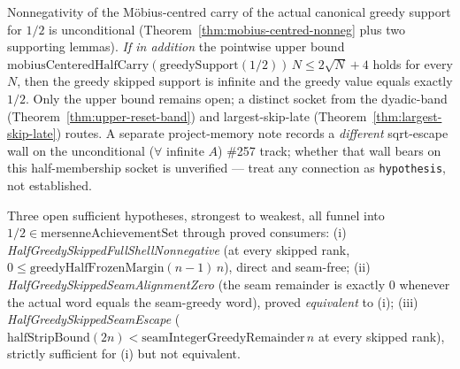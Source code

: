\begin{thm}
\label{thm:sqrt-bound-route}
Nonnegativity of the M\"obius-centred carry of the actual canonical greedy support for
$1/2$ is unconditional (Theorem~\ref{thm:mobius-centred-nonneg} plus two supporting
lemmas). \emph{If in addition} the pointwise upper bound
$\mathrm{mobiusCenteredHalfCarry}(\mathrm{greedySupport}(1/2))\,N\le 2\sqrt N+4$ holds for
every $N$, then the greedy skipped support is infinite and the greedy value equals
exactly $1/2$. Only the upper bound remains open; a distinct socket from the dyadic-band
(Theorem~\ref{thm:upper-reset-band}) and largest-skip-late
(Theorem~\ref{thm:largest-skip-late}) routes. A separate project-memory note records a
\emph{different} sqrt-escape wall on the unconditional ($\forall$ infinite $A$) \#257
track; whether that wall bears on this half-membership socket is unverified — treat any
connection as \texttt{hypothesis}, not established.
\par{}
\end{thm}

\begin{thm}
\label{thm:frozen-margin}
Three open sufficient hypotheses, strongest to weakest, all funnel into
$1/2\in\mathrm{mersenneAchievementSet}$ through proved consumers: (i)
\emph{HalfGreedySkippedFullShellNonnegative}
(at every skipped rank, $0\le\mathrm{greedyHalfFrozenMargin}(n-1)\,n$), direct and
seam-free; (ii) \emph{HalfGreedySkippedSeamAlignmentZero} (the seam remainder is exactly
$0$ whenever the actual word equals the seam-greedy word), proved \emph{equivalent} to
(i); (iii) \emph{HalfGreedySkippedSeamEscape} ($\mathrm{halfStripBound}(2n)<
\mathrm{seamIntegerGreedyRemainder}\,n$ at every skipped rank), strictly sufficient for
(i) but not equivalent.
\par{}
\end{thm}

